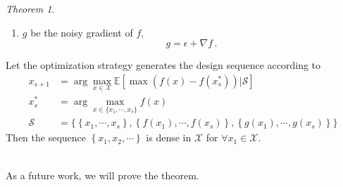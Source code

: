 \documentclass[a4paper,onecolumn]{article}
\theoremstyle{remark}
\newtheorem{theorem}{Theorem}
\begin{document}
{{\begin{theorem}
\begin{enumerate}
              $\epsilon_i\perp \epsilon_j\;$ for $i\neq j$.
        \item $g$ be the noisy gradient of $f$,
              $$
                  g = \epsilon + \nabla f\,.
              $$
    \end{enumerate}
    Let the optimization strategy generates the design sequence according to 
    \begin{equation*}\begin{split}
        x_{s+1} &= \arg\max_{x\in\mathcal{X}} \mathbb{E} \left[
        \max\left( f(x) -  f(x_s^*) \right) \Big| \mathcal{S}
        \right]\\
        x_s^* &= \arg\max_{x\in\{x_1,\cdots,x_s\}}f(x)\\
        \mathcal{S} &= \Big\{ \left\{x_1,\cdots, x_s\right\} ,
        \left\{f(x_1),\cdots, f(x_s)\right\},
        \left\{g(x_1),\cdots, g(x_s)\right\}\Big\}
    \end{split}\end{equation*}
    Then the sequence $\left\{ x_1, x_2, \cdots \right\}$ 
    is dense in $\mathcal{X}$ for $\forall x_1\in \mathcal{X}$.
    \label{theorem: 2}
\end{theorem}
}}\\

\noindent As a future work, we will prove the theorem.
\end{document}
